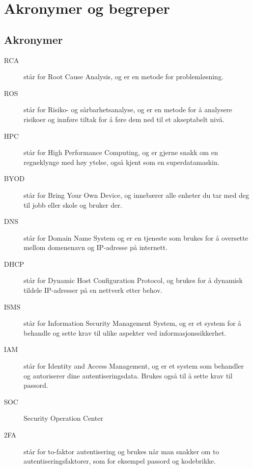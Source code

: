 \chapter*{Akronymer og begreper}
\label{kap:akronymer}

\section*{Akronymer}
\begin{description}
    \item[RCA] står for Root Cause Analysis, og er en metode for problemløsning.
    \item[ROS] står for Risiko- og sårbarhetsanalyse, og er en metode for å analysere risikoer og innføre tiltak for å føre dem ned til et akseptabelt nivå.
    \item[HPC] står for High Performance Computing, og er gjerne snakk om en regneklynge med høy ytelse, også kjent som en superdatamaskin.
    \item[BYOD] står for Bring Your Own Device, og innebærer alle enheter du tar med deg til jobb eller skole og bruker der.
    \item[DNS] står for Domain Name System og er en tjeneste som brukes for å oversette mellom domenenavn og IP-adresse på internett.
    \item[DHCP] står for Dynamic Host Configuration Protocol, og brukes for å dynamisk tildele IP-adresser på en nettverk etter behov.
    \item[ISMS] står for Information Security Management System, og er et system for å behandle og sette krav til ulike aspekter ved informasjonssikkerhet.
    \item[IAM] står for Identity and Access Management, og er et system som behandler og autoriserer dine autentiseringsdata. Brukes også til å sette krav til passord. 
    \item[SOC] Security Operation Center
    \item[2FA] står for to-faktor autentisering og brukes når man snakker om to autentiseringsfaktorer, som for eksempel passord og kodebrikke. 
\end{description}


